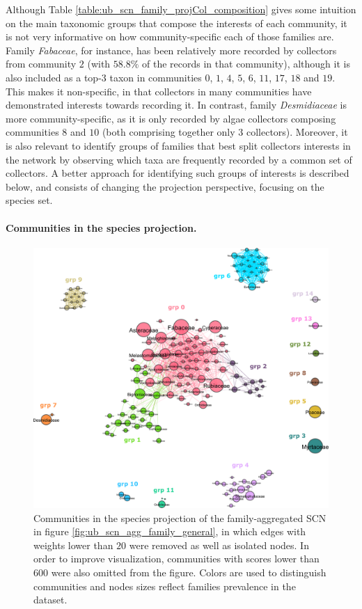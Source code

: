 Although Table \ref{table:ub_scn_family_projCol_composition} gives some intuition on the main taxonomic groups that compose the interests of each community, it is not very informative on how community-specific each of those families are.
Family \textit{Fabaceae}, for instance, has been relatively more recorded by collectors from community $2$ (with $58.8\%$ of the records in that community), although it is also included as a top-3 taxon in communities $0$, $1$, $4$, $5$, $6$, $11$, $17$, $18$ and $19$.
This makes it non-specific, in that collectors in many communities have demonstrated interests towards recording it.
In contrast, family \textit{Desmidiaceae} is more community-specific, as it is only recorded by algae collectors composing communities $8$ and $10$ (both comprising together only $3$ collectors).
Moreover, it is also relevant to identify groups of families that best split collectors interests in the network by observing which taxa are frequently recorded by a common set of collectors.
A better approach for identifying such groups of interests is described below, and consists of changing the projection perspective, focusing on the species set.

\paragraph*{Communities in the species projection.}
\begin{figure}[!ht]
  	\centering
    \includegraphics[width=\linewidth]{figures/casestudy_ub/scn_family_projSp_communities.pdf}
    \caption{ Communities in the species projection of the family-aggregated SCN in figure \ref{fig:ub_scn_agg_family_general}, in which edges with weights lower than $20$ were removed as well as isolated nodes. In order to improve visualization, communities with scores lower than $600$ were also omitted from the figure. Colors are used to distinguish communities and nodes sizes reflect families prevalence in the dataset.}
    \label{fig:ub_scn_family_projSp_communities}
\end{figure}

